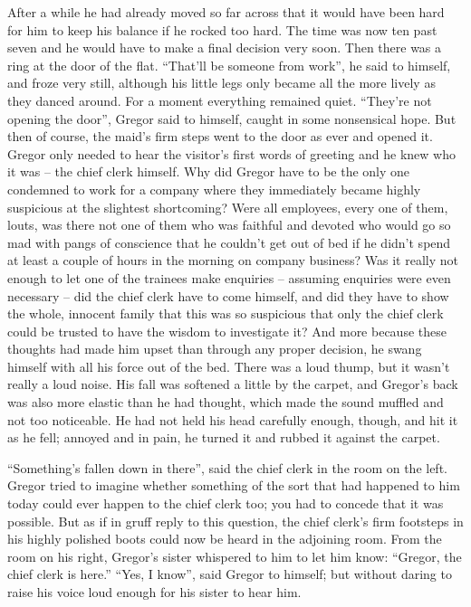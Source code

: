 After a while he had already moved so far across that it would have
been hard for him to keep his balance if he rocked too hard. The time
was now ten past seven and he would have to make a final decision very
soon. Then there was a ring at the door of the flat. “That’ll be
someone from work”, he said to himself, and froze very still, although
his little legs only became all the more lively as they danced around.
For a moment everything remained quiet. “They’re not opening the door”,
Gregor said to himself, caught in some nonsensical hope. But then of
course, the maid’s firm steps went to the door as ever and opened it.
Gregor only needed to hear the visitor’s first words of greeting and he
knew who it was – the chief clerk himself. Why did Gregor have to be the
only one condemned to work for a company where they immediately became
highly suspicious at the slightest shortcoming? Were all employees,
every one of them, louts, was there not one of them who was faithful
and devoted who would go so mad with pangs of conscience that he
couldn’t get out of bed if he didn’t spend at least a couple of hours
in the morning on company business? Was it really not enough to let one
of the trainees make enquiries – assuming enquiries were even
necessary – did the chief clerk have to come himself, and did they have
to show the whole, innocent family that this was so suspicious that
only the chief clerk could be trusted to have the wisdom to investigate
it? And more because these thoughts had made him upset than through any
proper decision, he swang himself with all his force out of the bed.
There was a loud thump, but it wasn’t really a loud noise. His fall was
softened a little by the carpet, and Gregor’s back was also more
elastic than he had thought, which made the sound muffled and not too
noticeable. He had not held his head carefully enough, though, and hit
it as he fell; annoyed and in pain, he turned it and rubbed it against
the carpet.

“Something’s fallen down in there”, said the chief clerk in the room on
the left. Gregor tried to imagine whether something of the sort that
had happened to him today could ever happen to the chief clerk too; you
had to concede that it was possible. But as if in gruff reply to this
question, the chief clerk’s firm footsteps in his highly polished boots
could now be heard in the adjoining room. From the room on his right,
Gregor’s sister whispered to him to let him know: “Gregor, the chief
clerk is here.” “Yes, I know”, said Gregor to himself; but without
daring to raise his voice loud enough for his sister to hear him.

